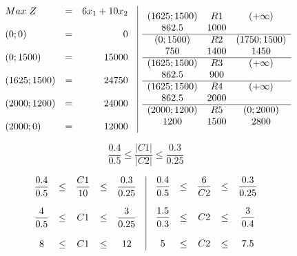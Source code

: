 \documentclass[12pt]{article}
\begin{document}
\newpage
\[
\begin{array}{c|c}
  \begin{array}{l c r}
    Max \ Z & = & 6x_1 + 10x_2 \\\\
    (0; 0) & = & 0 \\\\
    (0; 1500) & = & 15000 \\\\
    (1625; 1500) & = & 24750 \\\\
    (2000; 1200) & = & 24000 \\\\
    (2000; 0) & = & 12000
  \end{array}
  &
  \begin{array}{c c c}
    (1625; 1500) & R1 & (+\infty)\\
    862.5 & 1000 & \\
    \hline
    (0; 1500) & R2 & (1750; 1500) \\
    750 & 1400 & 1450 \\
    \hline
    (1625; 1500) & R3 & (+\infty)\\
    862.5 & 900 & \\
    \hline
    (1625; 1500) & R4 & (+\infty)\\
    862.5 & 2000 & \\
    \hline
    (2000; 1200) & R5 & (0; 2000)\\
    1200 & 1500 & 2800
  \end{array}
\end{array}
\]

\vspace{1cm}

\[ \dfrac{0.4}{0.5} \leq \dfrac{\left|C1\right|}{\left|C2\right|} \leq \dfrac{0.3}{0.25} \]

\[
\begin{array}{c|c}
  \begin{array}{c c c c c}
    \dfrac{0.4}{0.5} & \leq & \dfrac{C1}{10} & \leq & \dfrac{0.3}{0.25} \\\\
    \dfrac{4}{0.5} & \leq & C1 & \leq & \dfrac{3}{0.25} \\\\
    8 & \leq & C1 & \leq & 12
  \end{array}
  &
  \begin{array}{c c c c c}
    \dfrac{0.4}{0.5} & \leq & \dfrac{6}{C2} & \leq & \dfrac{0.3}{0.25} \\\\
    \dfrac{1.5}{0.3} & \leq & C2 & \leq & \dfrac{3}{0.4} \\\\
    5 & \leq & C2 & \leq & 7.5
  \end{array}
\end{array}
\]
\end{document}
